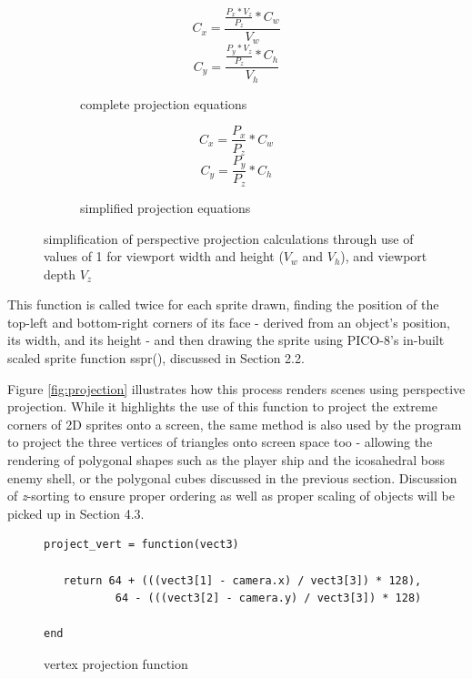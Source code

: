 \documentclass[11pt]{article}
\begin{document}
\begin{figure}[h]
   \begin{subfigure}{.45\textwidth}
   \centering
      \begin{equation}
         C_x = \frac{\frac{P_x * V_z} {P_z} * C_w} {V_w}
      \end{equation}
      \begin{equation}
         C_y = \frac{\frac{P_y * V_z} {P_z} * C_h} {V_h}
      \end{equation}
   \caption{complete projection equations}
   \label{fig:equationfullproject}
   \end{subfigure}\hfill
   \begin{subfigure}{.45\textwidth}
   \centering
      \begin{equation}
         C_x = \frac{P_x} {P_z} * C_w
      \end{equation}
      \begin{equation}
         C_y = \frac{P_y} {P_z} * C_h
      \end{equation}
   \caption{simplified projection equations}
   \label{fig:equationsimpleproject}
   \end{subfigure}\hfill
\caption{simplification of perspective projection calculations through use of values of 1 for viewport width
and height ($V_w$ and $V_h$), and viewport depth $V_z$}
\label{fig:equationsproject}
\end{figure}

This function is called twice for each sprite drawn, finding the position of the top-left and bottom-right
corners of its face - derived from an object's position, its width, and its height - and then drawing the
sprite using PICO-8's in-built scaled sprite function sspr(), discussed in Section 2.2.

Figure \ref{fig:projection} illustrates how this process renders scenes using perspective projection.
While it highlights the use of this function to project the extreme corners of 2D sprites onto a screen,
the same method is also used by the program to project the three vertices of triangles onto screen space
too - allowing the rendering of polygonal shapes such as the player ship and the icosahedral boss enemy shell,
or the polygonal cubes discussed in the previous section. Discussion of \textit{z}-sorting to ensure proper
ordering as well as proper scaling of objects will be picked up in Section 4.3.

\begin{figure}[h]
   \begin{lstlisting}
project_vert = function(vect3)

   return 64 + (((vect3[1] - camera.x) / vect3[3]) * 128),
           64 - (((vect3[2] - camera.y) / vect3[3]) * 128)

end
   \end{lstlisting}
   \caption{vertex projection function}
   \label{fig:codeproject}
\end{figure}
\end{document}
